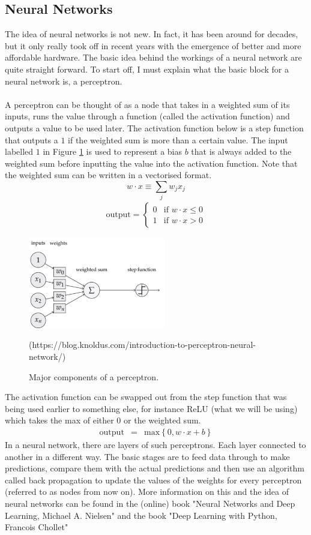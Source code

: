 \documentclass[10pt]{article}
\begin{document}
\subsection{Neural Networks}
The idea of neural networks is not new. In fact, it has been around for decades, but it only really took off in recent years with the emergence of better and more affordable hardware. The basic idea behind the workings of a neural network are quite straight forward. To start off, I must explain what the basic block for a neural network is, a perceptron.
\\\\
A perceptron can be thought of as a node that takes in a weighted sum of its inputs, runs the value through a function (called the activation function) and outputs a value to be used later. The activation function below is a step function that outputs a $1$ if the weighted sum is more than a certain value. The input labelled $1$ in Figure \ref{fig:perceptron} is used to represent a bias $b$ that is always added to the weighted sum before inputting the value into the activation function. Note that the weighted sum can be written in a vectorised format.
$$w \cdot x \equiv \sum_j w_j x_j$$
\begin{eqnarray}
  \mbox{output} = \left\{ 
    \begin{array}{ll} 
      0 & \mbox{if } w\cdot x \leq 0 \\
      1 & \mbox{if } w\cdot x > 0
    \end{array}
  \right.
\end{eqnarray}
\begin{figure}[H]
	\centering
	\includegraphics[width=6cm]{resources/perceptron.png}
	\caption{Major components of a perceptron.}
	\textsf{\small (https://blog.knoldus.com/introduction-to-perceptron-neural-network/)}
	\label{fig:perceptron}
\end{figure}
The activation function can be swapped out from the step function that was being used earlier to something else, for instance ReLU (what we will be using) which takes the max of either 0 or the weighted sum.
\begin{eqnarray}
  \mbox{output}&=& \mbox{max}\left\{0,w\cdot x + b\right\}
\end{eqnarray}
In a neural network, there are layers of such perceptrons. Each layer connected to another in a different way. The basic stages are to feed data through to make predictions, compare them with the actual predictions and then use an algorithm called back propagation to update the values of the weights for every perceptron (referred to as nodes from now on). More information on this and the idea of neural networks can be found in the (online) book "Neural Networks and Deep Learning, Michael A. Nielsen"\cite{neuralnets} and the book "Deep Learning with Python, Francois Chollet"\cite{deeplearning}
\end{document}
